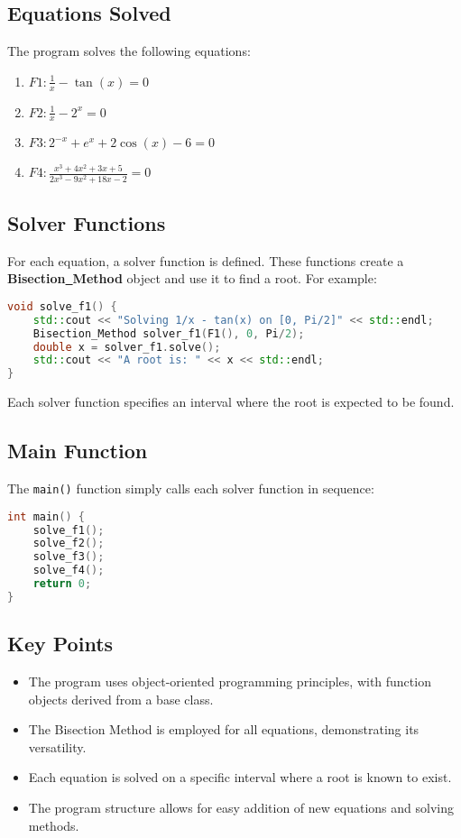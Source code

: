 \documentclass{article}
\begin{document}
\subsection{Equations Solved}
The program solves the following equations:
\begin{enumerate}
\item $F1: \frac{1}{x} - \tan(x) = 0$
\item $F2: \frac{1}{x} - 2^x = 0$
\item $F3: 2^{-x} + e^x + 2\cos(x) - 6 = 0$
\item $F4: \frac{x^3 + 4x^2 + 3x + 5}{2x^3 - 9x^2 + 18x - 2} = 0$
\end{enumerate}
\subsection{Solver Functions}
For each equation, a solver function is defined. These functions create a \textbf{Bisection\underline{~}Method} object and use it to find a root. For example:
\begin{lstlisting}[language=C++]
void solve_f1() {
    std::cout << "Solving 1/x - tan(x) on [0, Pi/2]" << std::endl;
    Bisection_Method solver_f1(F1(), 0, Pi/2);
    double x = solver_f1.solve();
    std::cout << "A root is: " << x << std::endl;
}
\end{lstlisting}
Each solver function specifies an interval where the root is expected to be found.
\subsection{Main Function}
The \texttt{main()} function simply calls each solver function in sequence:
\begin{lstlisting}[language=C++]
int main() {
    solve_f1();
    solve_f2();
    solve_f3();
    solve_f4();
    return 0;
}
\end{lstlisting}
\subsection{Key Points}
\begin{itemize}
\item The program uses object-oriented programming principles, with function objects derived from a base class.
\item The Bisection Method is employed for all equations, demonstrating its versatility.
\item Each equation is solved on a specific interval where a root is known to exist.
\item The program structure allows for easy addition of new equations and solving methods.
\end{itemize}
\end{document}

